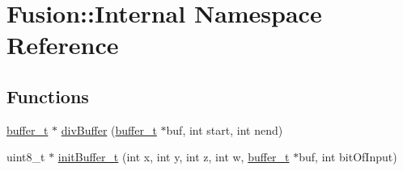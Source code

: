 \hypertarget{namespace_fusion_1_1_internal}{\section{Fusion\-:\-:Internal Namespace Reference}
\label{namespace_fusion_1_1_internal}
}
\subsection*{Functions}
\begin{DoxyCompactItemize}
\item 
\hyperlink{structbuffer__t}{buffer\-\_\-t} $\ast$ \hyperlink{namespace_fusion_1_1_internal_afa225bde679af6d7984014f0138aa97d}{div\-Buffer} (\hyperlink{structbuffer__t}{buffer\-\_\-t} $\ast$buf, int start, int nend)
\item 
uint8\-\_\-t $\ast$ \hyperlink{namespace_fusion_1_1_internal_a6e60ee6f87aefcec5b810c52ec9d4abb}{init\-Buffer\-\_\-t} (int x, int y, int z, int w, \hyperlink{structbuffer__t}{buffer\-\_\-t} $\ast$buf, int bit\-Of\-Input)
\end{DoxyCompactItemize}


